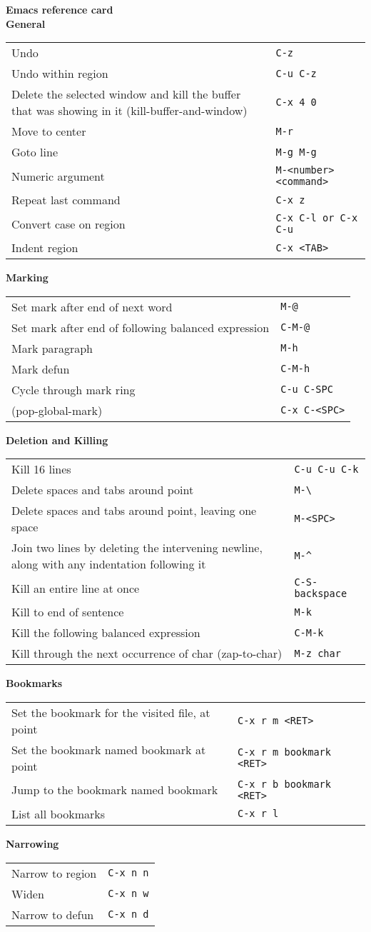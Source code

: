 \documentclass[a4paper,10pt,landscape,twocolumn]{article}
\newcommand{\keydescr}[2]{\small #2 & \small \texttt{#1} \\ }
\newenvironment{mykeys}[1]
               {\large{\textbf{#1}}\nopagebreak \medskip \\
                 \begin{tabular}{p{8cm}l} }
               {  \end{tabular} \bigskip }
\begin{document}
\textbf{\Huge{Emacs reference card}} \\

\begin{mykeys}{General}
  \keydescr{C-z}{
    Undo }
  \keydescr{C-u C-z}{Undo within region}
  \keydescr{C-x 4 0}{
    Delete the selected window and kill the buffer
    that was showing in it \mbox{(kill-buffer-and-window)} }
 \keydescr{M-r}{
   Move to center}
 \keydescr{M-g M-g} {
   Goto line}
 \keydescr{M-<number> <command>} {
   Numeric argument}
 \keydescr{C-x z} {
   Repeat last command}
 \keydescr{C-x C-l or C-x C-u}{Convert case on region}
 \keydescr{C-x <TAB>} {Indent region}
\end{mykeys}

\begin{mykeys}{Marking}
  \keydescr{M-@}{Set mark after end of next word}
  \keydescr{C-M-@}{Set mark after end of following balanced 
    expression}
  \keydescr{M-h}{Mark paragraph}
  \keydescr{C-M-h}{Mark defun}
  \keydescr{C-u C-SPC}{
    Cycle through mark ring }
  \keydescr{C-x C-<SPC>}{(pop-global-mark)}
\end{mykeys}

\begin{mykeys}{Deletion and Killing}
  \keydescr{C-u C-u C-k}{Kill 16 lines}
  \keydescr{M-\textbackslash{}}{Delete spaces and tabs around point}
  \keydescr{M-<SPC>}{Delete spaces and tabs around point, leaving one space}
  \keydescr{M-\^{}}{Join two lines by deleting the intervening newline, 
    along with any indentation following it}
  \keydescr{C-S-backspace}{Kill an entire line at once}
  \keydescr{M-k}{Kill to end of sentence}
  \keydescr{C-M-k}{Kill the following balanced expression}
  \keydescr{M-z char}{Kill through the next occurrence of char (zap-to-char)}
\end{mykeys}

\begin{mykeys}{Bookmarks}
  \keydescr{C-x r m <RET>}{Set the bookmark for the visited file, at point}
  \keydescr{C-x r m bookmark <RET>} {Set the bookmark
    named bookmark at point }
  \keydescr{C-x r b bookmark <RET>}{Jump to the bookmark 
    named bookmark}
  \keydescr{C-x r l} { List all bookmarks}  
\end{mykeys}

\begin{mykeys}{Narrowing}
 \keydescr{C-x n n}
          {Narrow to region}
 \keydescr{C-x n w}
          {Widen}
 \keydescr{C-x n d}
          {Narrow to defun}
\end{mykeys}
\end{document}
